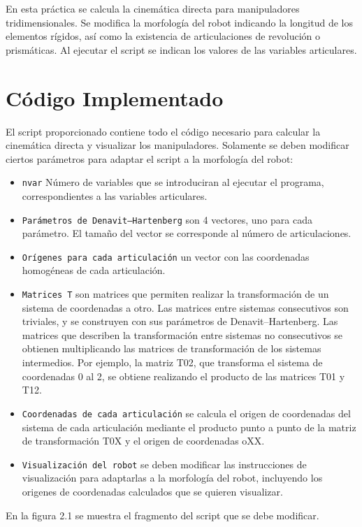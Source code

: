 En esta práctica se calcula la cinemática directa para manipuladores tridimensionales. 
Se modifica la morfología del robot indicando la longitud de los elementos rígidos, así como la existencia de articulaciones de revolución o prismáticas.
Al ejecutar el script se indican los valores de las variables articulares.

\section{Código Implementado}
El script proporcionado contiene todo el código necesario para calcular la cinemática directa y visualizar los manipuladores. 
Solamente se deben modificar ciertos parámetros para adaptar el script a la morfología del robot:
\begin{itemize}
   \item \texttt{nvar} Número de variables que se introduciran al ejecutar el programa, correspondientes a las variables articulares.
   \item \texttt{Parámetros de Denavit–Hartenberg} son 4 vectores, uno para cada parámetro. El tamaño del vector se corresponde al número de articulaciones.
   \item \texttt{Orígenes para cada articulación} un vector con las coordenadas homogéneas de cada articulación.
   \item \texttt{Matrices T} son matrices que permiten realizar la transformación de un sistema de coordenadas a otro.
   Las matrices entre sistemas consecutivos son triviales, y se construyen con sus parámetros de Denavit–Hartenberg.
   Las matrices que describen la transformación entre sistemas no consecutivos se obtienen multiplicando las matrices de transformación de los sistemas intermedios.
   Por ejemplo, la matriz T02, que transforma el sistema de coordenadas 0 al 2, se obtiene realizando el producto de las matrices T01 y T12.
   \item \texttt{Coordenadas de cada articulación} se calcula el origen de coordenadas del sistema de cada articulación mediante el producto punto a punto de la matriz de transformación T0X y el origen de coordenadas oXX.
   \item \texttt{Visualización del robot} se deben modificar las instrucciones de visualización para adaptarlas a la morfología del robot, incluyendo los origenes de coordenadas calculados que se quieren visualizar.
\end{itemize}
En la figura 2.1 se muestra el fragmento del script que se debe modificar.
